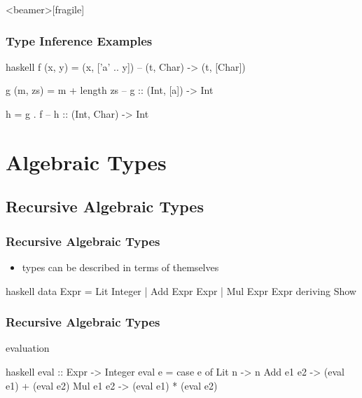 \documentclass[dvipsnames]{beamer}
\theoremstyle{plain}
\begin{document}
\begin{frame}<beamer>[fragile]
  \frametitle{Type Inference Examples}

  \begin{exampleblock}{}
    \begin{pygments}{haskell}
f (x, y) = (x, ['a' .. y])
-- (t, Char) -> (t, [Char])

g (m, zs) = m + length zs
-- g :: (Int, [a]) -> Int

h = g . f
-- h :: (Int, Char) -> Int
    \end{pygments}
  \end{exampleblock}
\end{frame}

\section{Algebraic Types}

\subsection{Recursive Algebraic Types}

\begin{frame}[fragile]
  \frametitle{Recursive Algebraic Types}

  \begin{itemize}
    \item types can be described in terms of themselves
  \end{itemize}

  \begin{exampleblock}{}
    \begin{pygments}{haskell}
data Expr = Lit Integer |
            Add Expr Expr |
            Mul Expr Expr
            deriving Show
    \end{pygments}
  \end{exampleblock}
\end{frame}

\begin{frame}[fragile]
  \frametitle{Recursive Algebraic Types}

  \begin{exampleblock}{evaluation}
    \begin{pygments}{haskell}
eval :: Expr -> Integer
eval e =
  case e of
     Lit n     -> n
     Add e1 e2 -> (eval e1) + (eval e2)
     Mul e1 e2 -> (eval e1) * (eval e2)
    \end{pygments}
  \end{exampleblock}
\end{frame}
\end{document}
